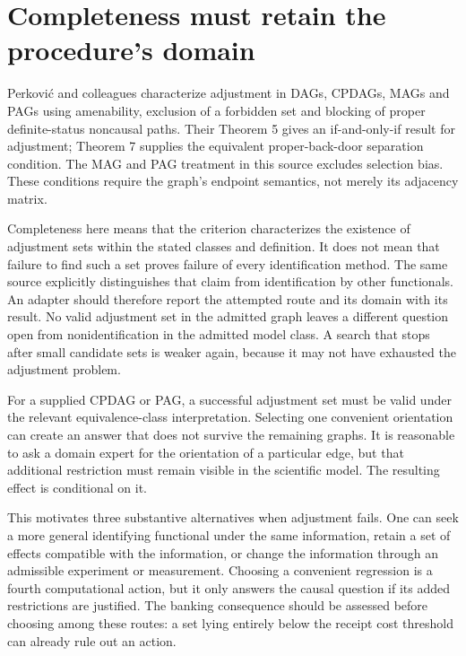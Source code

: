 \section{Completeness must retain the procedure's domain}

Perkovi\'c and colleagues characterize adjustment in DAGs, CPDAGs,
MAGs and PAGs using amenability, exclusion of a forbidden set and blocking
of proper definite-status noncausal paths. Their Theorem 5 gives an
if-and-only-if result for adjustment; Theorem 7 supplies the equivalent
proper-back-door separation condition. The MAG and PAG treatment in this
source excludes selection bias. These conditions require the graph's
endpoint semantics, not merely its adjacency
matrix.~\citep{perkovic2018}

Completeness here means that the criterion characterizes the existence
of adjustment sets within the stated classes and definition. It does
not mean that failure to find such a set proves failure of every
identification method. The same source explicitly distinguishes that
claim from identification by other functionals. An adapter should
therefore report the attempted route and its domain with its result.
No valid adjustment set in the admitted graph leaves a different
question open from nonidentification in the admitted model class.
A search that stops after small candidate sets is weaker again,
because it may not have exhausted the adjustment
problem.~\citep{perkovic2018}

For a supplied CPDAG or PAG, a successful adjustment set must be valid
under the relevant equivalence-class interpretation. Selecting one
convenient orientation can create an answer that does not survive the
remaining graphs. It is reasonable to ask a domain expert for the
orientation of a particular edge, but that additional restriction must
remain visible in the scientific model. The resulting effect is
conditional on it.

This motivates three substantive alternatives when adjustment fails.
One can seek a more general identifying functional under the same
information, retain a set of effects compatible with the information,
or change the information through an admissible experiment or
measurement. Choosing a convenient regression is a fourth computational
action, but it only answers the causal question if its added
restrictions are justified. The banking consequence should be assessed
before choosing among these routes: a set lying entirely below the
receipt cost threshold can already rule out an action.

